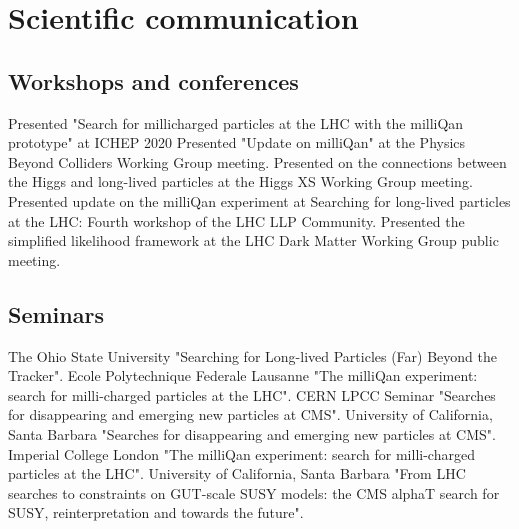 %

\section{Scientific communication}
\subsection{Workshops and conferences}
 {Presented "Search for millicharged particles at the LHC with the milliQan prototype" at ICHEP 2020}
 {Presented "Update on milliQan" at the Physics Beyond Colliders Working Group meeting.}
\vspace{0.1cm}
 {Presented on the connections between the Higgs and long-lived particles at the Higgs XS Working Group meeting.}
\vspace{0.1cm}
 {Presented update on the milliQan experiment at Searching for long-lived particles at the LHC: Fourth workshop of the LHC LLP Community.}
\vspace{0.1cm}
 {Presented the simplified likelihood framework at the LHC Dark Matter Working Group public meeting.}
\vspace{0.1cm}
\vspace{0.1cm}
\vspace{0.1cm}
\subsection{Seminars}
 {The Ohio State University "Searching for Long-lived Particles (Far) Beyond the Tracker".}
\vspace{0.1cm}
 {Ecole Polytechnique Federale Lausanne "The milliQan experiment: search for milli-charged particles at the LHC".}
\vspace{0.1cm}
 {CERN LPCC Seminar "Searches for disappearing and emerging new particles at CMS".}
\vspace{0.1cm}
 {University of California, Santa Barbara "Searches for disappearing and emerging new particles at CMS".}
\vspace{0.1cm}
 {Imperial College London "The milliQan experiment: search for milli-charged particles at the LHC".}
\vspace{0.1cm}
 {University of California, Santa Barbara "From LHC searches to constraints on GUT-scale SUSY models: the CMS alphaT search for SUSY, reinterpretation and towards the future".}
\vspace{0.1cm}


